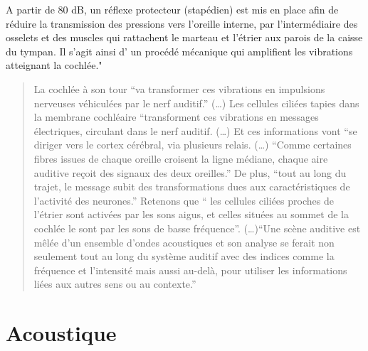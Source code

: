 A partir de 80 dB, un réflexe protecteur (stapédien) est mis en place
afin de réduire la transmission des pressions vers l\textquoteright oreille
interne, par l\textquoteright intermédiaire des osselets et des muscles
qui rattachent le marteau et l\textquoteright étrier aux parois de
la caisse du tympan. Il s'agit ainsi d' un procédé mécanique qui amplifient
les vibrations atteignant la cochlée."
\begin{quotation}
	La cochlée à son tour ``va transformer ces vibrations en impulsions
	nerveuses véhiculées par le nerf auditif.'' (\dots) Les cellules ciliées
	tapies dans la membrane cochléaire ``transforment ces vibrations
	en messages électriques, circulant dans le nerf auditif. (\dots) Et
	ces informations vont ``se diriger vers le cortex cérébral, via plusieurs
	relais. (\dots) ``Comme certaines fibres issues de chaque oreille croisent
	la ligne médiane, chaque aire auditive reçoit des signaux des deux
	oreilles.'' De plus, ``tout au long du trajet, le message subit
	des transformations dues aux caractéristiques de l'activité des neurones.''
	Retenons que `` les cellules ciliées proches de l'étrier sont activées
	par les sons aigus, et celles situées au sommet de la cochlée le sont
	par les sons de basse fréquence''. (\dots)``Une scène auditive est
	mêlée d'un ensemble d'ondes acoustiques et son analyse se ferait non
	seulement tout au long du système auditif avec des indices comme la
	fréquence et l'intensité mais aussi au-delà, pour utiliser les informations
	liées aux autres sens ou au contexte.'' \autocite[~15--16]{bigand:cerveau}
\end{quotation}


\section{Acoustique}

